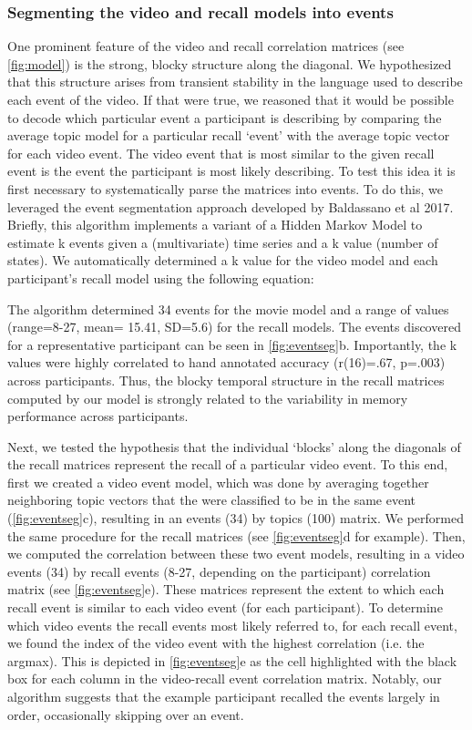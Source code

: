 \documentclass[a4paper,man,natbib,floatsintext]{apa6}
\begin{document}
\subsubsection{Segmenting the video and recall models into events}
One prominent feature of the video and recall correlation matrices (see \ref{fig:model}) is the strong, blocky structure along the diagonal.  We hypothesized that this structure arises from transient stability in the language used to describe each event of the video. If that were true, we reasoned that it would be possible to decode which particular event a participant is describing by comparing the average topic model for a particular recall `event' with the average topic vector for each video event. The video event that is most similar to the given recall event is the event the participant is most likely describing.  To test this idea it is first necessary to systematically parse the matrices into events.  To do this, we leveraged the event segmentation approach developed by Baldassano et al 2017.  Briefly, this algorithm implements a variant of a Hidden Markov Model to estimate k events given a (multivariate) time series and a k value (number of states). We automatically determined a k value for the video model and each participant's recall model using the following equation:


The algorithm determined 34 events for the movie model and a range of values (range=8-27, mean= 15.41, SD=5.6) for the recall models.  The events discovered for a representative participant can be seen in \ref{fig:eventseg}b. Importantly, the k values were highly correlated to hand annotated accuracy (r(16)=.67, p=.003) across participants. Thus, the blocky temporal structure in the recall matrices computed by our model is strongly related to the variability in memory performance across participants.

Next, we tested the hypothesis that the individual `blocks' along the diagonals of the recall matrices represent the recall of a particular video event. To this end, first we created a video event model, which was done by averaging together neighboring topic vectors that the were classified to be in the same event (\ref{fig:eventseg}c), resulting in an events (34) by topics (100) matrix.  We performed the same procedure for the recall matrices (see \ref{fig:eventseg}d for example). Then, we computed the correlation between these two event models, resulting in a video events (34) by recall events (8-27, depending on the participant) correlation matrix (see \ref{fig:eventseg}e). These matrices represent the extent to which each recall event is similar to each video event (for each participant). To determine which video events the recall events most likely referred to, for each recall event, we found the index of the video event with the highest correlation (i.e. the argmax).  This is depicted in \ref{fig:eventseg}e as the cell highlighted with the black box for each column in the video-recall event correlation matrix. Notably, our algorithm suggests that the example participant recalled the events largely in order, occasionally skipping over an event.
\end{document}
